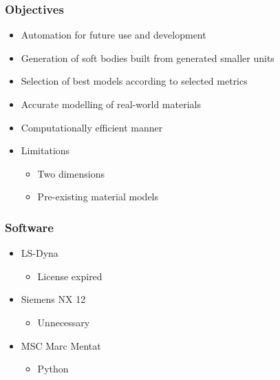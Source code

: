 \documentclass[serif, pdf]{beamer}
\begin{document}
\begin{frame}
    \frametitle{Objectives}
    \begin{itemize}
        \item<1-> Automation for future use and development
        \item<2-> Generation of soft bodies built from generated smaller units
        \item<3-> Selection of best models according to selected metrics
        \item<4-> Accurate modelling of real-world materials
        \item<5-> Computationally efficient manner
        \item<6-> Limitations
        \changefontsizes{11pt}
        \begin{itemize}
            \item<7-> Two dimensions
            \item<8-> Pre-existing material models
        \end{itemize}
    \end{itemize}
\end{frame}


\changefontsizes{13pt}
\begin{frame}
    \frametitle{Software}
    \begin{itemize}
        \item<1-> LS-Dyna
        \changefontsizes{11pt}
        \begin{itemize}
            \item<2-> License expired
        \end{itemize}
        \item<3-> Siemens NX 12
        \changefontsizes{11pt}
        \begin{itemize}
            \item<4-> Unnecessary
        \end{itemize}
        \item<3-> MSC Marc Mentat
        \changefontsizes{11pt}
        \begin{itemize}
            \item<5-> Python
        \end{itemize}
    \end{itemize}
\end{frame}

\end{document}
